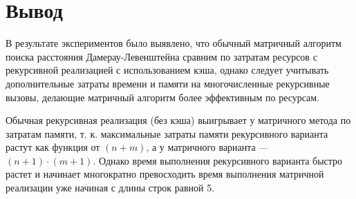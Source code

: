 \section*{Вывод}

В результате экспериментов было выявлено, что обычный матричный алгоритм поиска расстояния Дамерау-Левенштейна сравним по затратам ресурсов с рекурсивной реализацией с использованием кэша, однако следует учитывать дополнительные затраты времени и памяти на многочисленные рекурсивные вызовы, делающие матричный алгоритм более эффективным по ресурсам.

Обычная рекурсивная реализация (без кэша) выигрывает у матричного метода по затратам памяти, т. к. максимальные затраты памяти рекурсивного варианта растут как функция от $(n + m)$, а у матричного варианта --- $(n+1)\cdot(m+1)$. Однако время выполнения рекурсивного варианта быстро растет и начинает многократно превосходить время выполнения матричной реализации уже начиная с длины строк равной 5.




